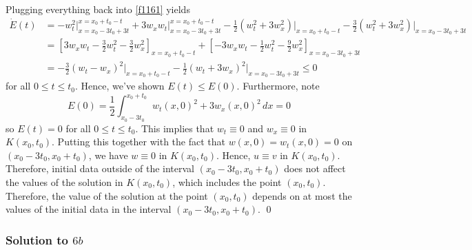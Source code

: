 Plugging everything back into \eqref{f1161} yields
\begin{align*}
\dot{E}(t) &= -w_t^2 \bigg|_{x=x_0 - 3t_0 + 3t}^{x=x_0 + t_0 - t} + 3w_x w_t \bigg|_{x=x_0 - 3t_0 + 3t}^{x=x_0 + t_0 - t}- \frac{1}{2} (w_t^2 + 3w_x^2) \bigg|_{x = x_0 + t_0 - t} - \frac{3}{2} (w_t^2 + 3w_x^2) \bigg|_{x = x_0 -3t_0 + 3t} \\
&= \left[ 3w_x w_t -\frac{3}{2} w_t^2 - \frac{3}{2} w_x^2 \right]_{x = x_0 + t_0 - t} +  \left[-3w_x w_t - \frac{1}{2} w_t^2 - \frac{9}{2} w_x^2 \right]_{x = x_0 - 3t_0 + 3t} \\
&= -\frac{3}{2} (w_t - w_x)^2 \bigg|_{x=x_0 + t_0 -t} - \frac{1}{2} (w_t + 3w_x)^2 \bigg|_{x = x_0 - 3t_0 + 3t} \leq 0
\end{align*}
for all $0 \leq t \leq t_0$. Hence, we've shown $E(t) \leq E(0)$. Furthermore, note
$$
E(0) = \frac{1}{2} \int_{x_0 - 3t_0}^{x_0+t_0} w_t(x,0)^2 + 3w_x(x,0)^2 \, dx = 0
$$
so $E(t) = 0$ for all $0 \leq t \leq t_0$. This implies that $w_t \equiv 0$ and $w_x \equiv 0$ in $K(x_0,t_0)$. Putting this together with the fact that $w(x,0) = w_t(x,0) = 0$ on $(x_0-3t_0, x_0+t_0)$, we have $w \equiv 0$ in $K(x_0,t_0)$. Hence, $u \equiv v$ in $K(x_0,t_0)$. Therefore, initial data outside of the interval $(x_0-3t_0,x_0+t_0)$ does not affect the values of the solution in $K(x_0,t_0)$, which includes the point $(x_0,t_0)$. Therefore, the value of the solution at the point $(x_0,t_0)$ depends on at most the values of the initial data in the interval $(x_0-3t_0, x_0+ t_0)$.  \hfill \qed

\subsubsection*{Solution to $6b$}

